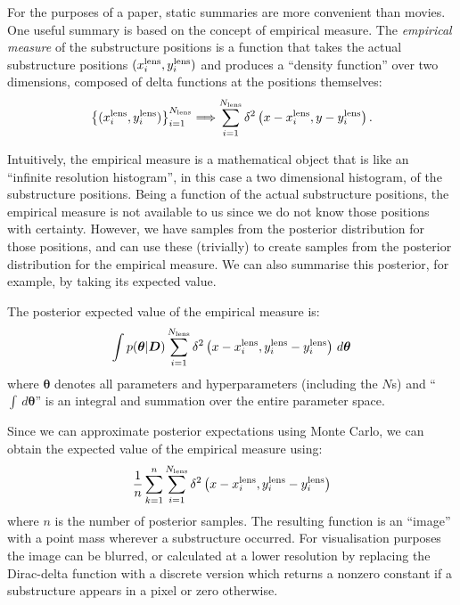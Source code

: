 \documentclass[useAMS,usenatbib]{mn2e}
\begin{document}
For the purposes of a paper, static summaries are more convenient than movies.
One useful summary is based on the concept of empirical measure.
The {\it empirical measure} of the substructure positions is a function that
takes the actual substructure positions $(x_i^{\rm lens}, y_i^{\rm lens})$ and
produces a ``density function'' over two dimensions, composed of delta
functions at the positions themselves:
\begin{eqnarray}
\left\{
(x_i^{\rm lens}, y_i^{\rm lens})
\right\}_{i=1}^{N_{\rm lens}}
\Longrightarrow
\sum_{i=1}^{N_{\rm lens}}
\delta^2\left(x - x_i^{\rm lens}, y - y_i^{\rm lens}\right).
\end{eqnarray}

Intuitively, the empirical measure is a mathematical object that is like
an ``infinite resolution histogram'', in this case a two dimensional histogram,
of the substructure positions.
Being a function of the actual substructure positions, the empirical measure
is not available to us since we do not know those positions with certainty.
However, we have samples from the posterior distribution for those positions,
and can use these (trivially) to create samples from the posterior distribution
for the empirical measure. We can also summarise this posterior, for example,
by taking its expected value.

The posterior expected value of the empirical measure is:
\begin{eqnarray}
\int p(\boldsymbol{\theta} | \boldsymbol{D})
\sum_{i=1}^{N_{\rm lens}}
\delta^2\left(x - x_i^{\rm lens}, y_i^{\rm lens} - y_i^{\rm lens}\right)
\, d\boldsymbol{\theta}
\end{eqnarray}
where $\boldsymbol{\theta}$ denotes all parameters and hyperparameters
(including the $N$s) and ``$\int \,d\boldsymbol{\theta}$'' is an integral and summation over the entire parameter space.

Since we can approximate posterior expectations using Monte Carlo, we can
obtain the expected value of the empirical measure using:
\begin{eqnarray}
\frac{1}{n}
\sum_{k=1}^n
\sum_{i=1}^{N_{\rm lens}}
\delta^2\left(x - x_i^{\rm lens}, y_i^{\rm lens} - y_i^{\rm lens}\right)
\end{eqnarray}
where $n$ is the number of posterior samples. The resulting function is
an ``image'' with a point mass wherever a substructure occurred. For
visualisation purposes the image can be blurred, or calculated at a lower
resolution by replacing the Dirac-delta function with a discrete version
which returns a nonzero constant
if a substructure appears in a pixel or zero otherwise.
\end{document}
